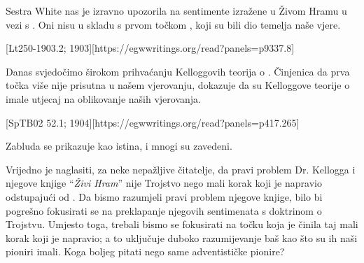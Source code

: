 Sestra White nas je izravno upozorila na sentimente izražene u Živom Hramu u vezi s . Oni nisu u skladu s prvom točkom , koji su bili dio temelja naše vjere.

[Lt250-1903.2; 1903][https://egwwritings.org/read?panels=p9337.8]

Danas svjedočimo širokom prihvaćanju Kelloggovih teorija o . Činjenica da prva točka  više nije prisutna u našem vjerovanju, dokazuje da su Kelloggove teorije o  imale utjecaj na oblikovanje naših vjerovanja.

[SpTB02 52.1; 1904][https://egwwritings.org/read?panels=p417.265]

Zabluda se prikazuje kao istina, i mnogi su zavedeni.

Vrijedno je naglasiti, za neke nepažljive čitatelje, da pravi problem Dr. Kellogga i njegove knjige “\textit{Živi Hram}” nije Trojstvo nego mali korak koji je napravio odstupajući od . Da bismo razumjeli pravi problem njegove knjige, bilo bi pogrešno fokusirati se na preklapanje njegovih sentimenata s doktrinom o Trojstvu. Umjesto toga, trebali bismo se fokusirati na točku koja je činila taj mali korak koji je napravio; a to uključuje duboko razumijevanje  baš kao što su ih naši pioniri imali. Koga boljeg pitati nego same adventističke pionire?

